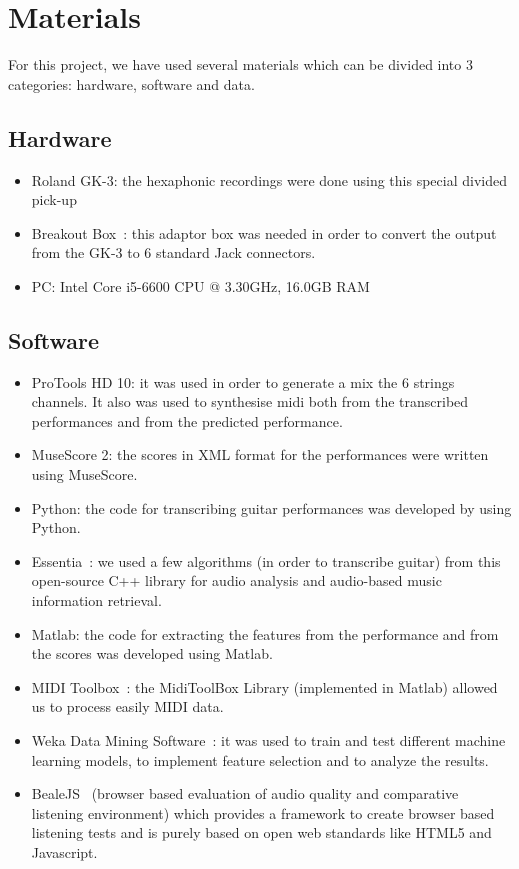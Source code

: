 \chapter{Materials}
\label{chap:materials}
For this project, we have used several materials which can be divided into 3 categories: hardware, software and data.

\section*{Hardware}
\begin{itemize}[noitemsep]
\item Roland GK-3: the hexaphonic recordings were done using this special divided pick-up
\item Breakout Box~\cite{OGrady2009}: this adaptor box was needed in order to convert the output from the GK-3 to 6 standard Jack connectors.
\item PC: Intel Core i5-6600 CPU @ 3.30GHz, 16.0GB RAM
\end{itemize}

\section*{Software}
\begin{itemize}[noitemsep]
\item ProTools HD 10: it was used in order to generate a mix the 6 strings channels. It also was used to synthesise midi both from the transcribed performances and from the predicted performance.
\item MuseScore 2: the scores in XML format for the performances were written using MuseScore.
\item Python: the code for transcribing guitar performances was developed by using Python.
\item Essentia~\cite{bogdanov2013essentia}: we used a few algorithms (in order to transcribe guitar) from this open-source C++ library for audio analysis and audio-based music information retrieval.
\item Matlab: the code for extracting the features from the performance and from the scores was developed using Matlab.
\item MIDI Toolbox~\cite{eerola2004midi}: the MidiToolBox Library (implemented in Matlab) allowed us to process easily MIDI data.
\item Weka Data Mining Software~\cite{hall2009weka}: it was used to train and test different machine learning models, to implement feature selection and to analyze the results.
\item BealeJS~\cite{kraft2014beaqlejs} (browser based evaluation of audio quality and comparative listening environment) which provides a framework to create browser based listening tests and is purely based on open web standards like HTML5 and Javascript.
\end{itemize}

